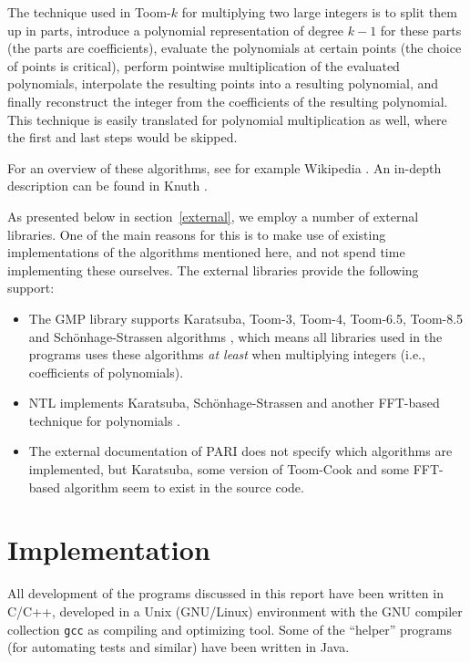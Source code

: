 \documentclass{cslthse-msc}
\newcommand{\code}{\texttt}
\begin{document}
The technique used in Toom-$k$ for multiplying two large integers is to split them up in parts, introduce a polynomial representation of degree $k-1$ for these parts (the parts are coefficients), evaluate the polynomials at certain points (the choice of points is critical), perform pointwise multiplication of the evaluated polynomials, interpolate the resulting points into a resulting polynomial, and finally reconstruct the integer from the coefficients of the resulting polynomial. This technique is easily translated for polynomial multiplication as well, where the first and last steps would be skipped.

For an overview of these algorithms, see for example Wikipedia \cite{strass} \cite{toom-cook}. An in-depth description can be found in Knuth \cite[sec. 4.3.3]{knuth2}.

As presented below in section~\ref{external}, we employ a number of external libraries. One of the main reasons for this is to make use of existing implementations of the algorithms mentioned here, and not spend time implementing these ourselves. The external libraries provide the following support:

\begin{itemize}
 \item The GMP library supports Karatsuba, Toom-3, Toom-4, Toom-6.5, Toom-8.5 and Schönhage-Strassen algorithms \cite[p. 90]{gmp}, which means all libraries used in the programs uses these algorithms \emph{at least} when multiplying integers (i.e., coefficients of polynomials).
 \item NTL implements Karatsuba, Schönhage-Strassen and another FFT-based technique for polynomials \cite{ntl_zzx}.
 \item The external documentation of PARI does not specify which algorithms are implemented, but Karatsuba, some version of Toom-Cook and some FFT-based algorithm seem to exist in the source code.
\end{itemize}

\section{Implementation}\label{implementation}
All development of the programs discussed in this report have been written in C/C++, developed in a Unix (GNU/Linux) environment with the GNU compiler collection \code{gcc} as compiling and optimizing tool. Some of the ``helper'' programs (for automating tests and similar) have been written in Java.
\end{document}
